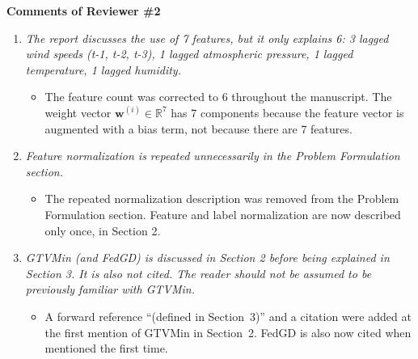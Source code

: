 \documentclass[11pt,onecolumn]{IEEEtran}
\begin{document}
\begin{center}
      {\bf\large Comments of Reviewer \#2}
      \vspace{1mm}
\end{center}

\begin{enumerate}

      \item[2.1] {\em The report discusses the use of 7 features, but it only explains 6:
            3 lagged wind speeds (t-1, t-2, t-3), 1 lagged atmospheric pressure, 1 lagged temperature,
            1 lagged humidity.}

            \vspace*{2mm}
            \begin{itemize}
                  \item The feature count was corrected to 6 throughout the manuscript.
                        The weight vector $\mathbf{w}^{(i)} \in \mathbb{R}^7$ has 7 components because the
                        feature vector is augmented with a bias term, not because there are 7 features.
            \end{itemize}
            \vspace*{4mm}

      \item[2.2] {\em Feature normalization is repeated unnecessarily in the Problem Formulation section.}

            \vspace*{2mm}
            \begin{itemize}
                  \item The repeated normalization description was removed from the Problem Formulation section.
                        Feature and label normalization are now described only once, in Section 2.
            \end{itemize}
            \vspace*{4mm}

      \item[2.3] {\em GTVMin (and FedGD) is discussed in Section 2 before being explained in Section 3.
            It is also not cited. The reader should not be assumed to be previously familiar with GTVMin.}

            \vspace*{2mm}
            \begin{itemize}
                  \item A forward reference ``(defined in Section~3)'' and a citation
                        were added at the first mention of GTVMin in Section~2.
                        FedGD is also now cited when mentioned the first time.
            \end{itemize}
            \vspace*{4mm}


\end{enumerate}
\end{document}
